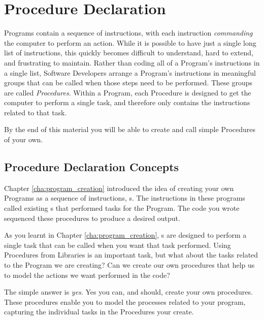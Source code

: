 \chapter{Procedure Declaration} %
\label{cha:procedure_declaration}

Programs contain a sequence of instructions, with each instruction \emph{commanding} the computer to perform an action. While it is possible to have just a single long list of instructions, this quickly becomes difficult to understand, hard to extend, and frustrating to maintain. Rather than coding all of a Program's instructions in a single list, Software Developers arrange a Program's instructions in meaningful groups that can be called when those steps need to be performed. These groups are called \emph{Procedures}. Within a Program, each Procedure is designed to get the computer to perform a single task, and therefore only contains the instructions related to that task.

By the end of this material you will be able to create and call simple Procedures of your own. 

\minitoc

\clearpage
\section{Procedure Declaration Concepts} %
\label{sec:procedure_declaration_concepts}

Chapter \ref{cha:program_creation}  introduced the idea of creating your own Programs as a sequence of instructions, s. The instructions in these programs called existing s that performed tasks for the Program. The code you wrote sequenced these procedures to produce a desired output.

As you learnt in Chapter \ref{cha:program_creation}, s are designed to perform a single task that can be called when you want that task performed. Using Procedures from Libraries is an important task, but what about the tasks related to the Program we are creating? Can we create our own procedures that help us to model the actions we want performed in the code?

The simple answer is \emph{yes}. Yes you can, and should, create your own procedures. These procedures enable you to model the processes related to your program, capturing the individual tasks in the Procedures your create. 

